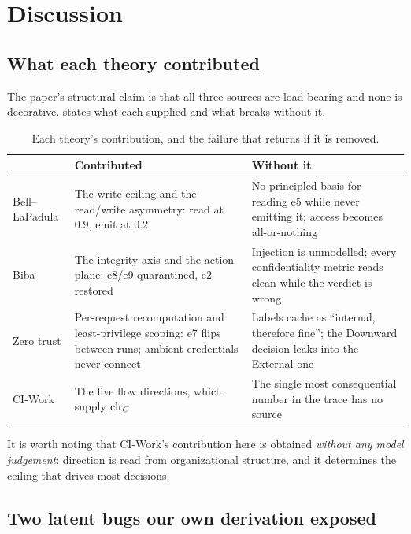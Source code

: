 \section{Discussion}
\label{sec:discussion}

\subsection{What each theory contributed}

The paper's structural claim is that all three sources are load-bearing and
none is decorative.  states what each supplied and what
breaks without it.

\begin{table}[t]
\centering
\caption{Each theory's contribution, and the failure that returns if it is
removed.}
\label{tab:contributions}
\footnotesize
\begin{tabular}{@{}lp{}p{}@{}}
\toprule
& \textbf{Contributed} & \textbf{Without it} \\
\midrule
Bell--LaPadula
& The write ceiling and the read/write asymmetry: read at $0.9$, emit at $0.2$
& No principled basis for reading e5 while never emitting it; access becomes
  all-or-nothing \\[3pt]
Biba
& The integrity axis and the action plane: e8/e9 quarantined, e2 restored
& Injection is unmodelled; every confidentiality metric reads clean while the
  verdict is wrong \\[3pt]
Zero trust
& Per-request recomputation and least-privilege scoping: e7 flips between
  runs; ambient credentials never connect
& Labels cache as ``internal, therefore fine''; the Downward decision leaks
  into the External one \\[3pt]
CI-Work
& The five flow directions, which supply $\mathrm{clr}_C$
& The single most consequential number in the trace has no source \\
\bottomrule
\end{tabular}
\end{table}

It is worth noting that CI-Work's contribution here is obtained \emph{without
any model judgement}: direction is read from organizational structure, and it
determines the ceiling that drives most decisions.

\subsection{Two latent bugs our own derivation exposed}
\label{sec:discussion:bugs}

